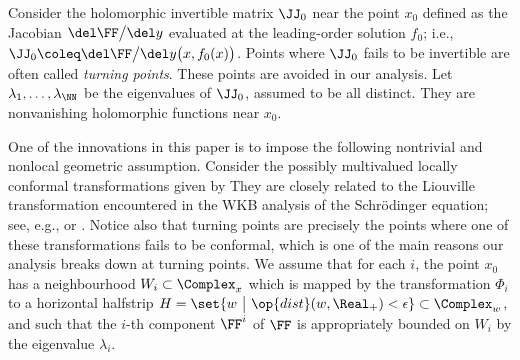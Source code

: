 \documentclass[11pt]{article}
\begin{document}
Consider the holomorphic invertible matrix $\JJ_0$ near the point $x_0$ defined as the Jacobian $\del \FF \big/ \del y$ evaluated at the leading-order solution $f_0$; i.e., $\JJ_0 \coleq \del \FF \big/ \del y\big(x, f_0 (x)\big)$.
Points where $\JJ_0$ fails to be invertible are often called \textit{turning points}.
These points are avoided in our analysis.
Let $\lambda_1, \ldots, \lambda_\NN$ be the eigenvalues of $\JJ_0$, assumed to be all distinct.
They are nonvanishing holomorphic functions near $x_0$.

One of the innovations in this paper is to impose the following nontrivial and nonlocal geometric assumption.
Consider the possibly multivalued locally conformal transformations given by
\vspace{-10pt}
They are closely related to the Liouville transformation encountered in the WKB analysis of the Schrödinger equation; see, e.g., \cite[§4.1]{MY210623112236} or \cite[§6.1]{MR1429619}.
Notice also that turning points are precisely the points where one of these transformations fails to be conformal, which is one of the main reasons our analysis breaks down at turning points.
We assume that for each $i$, the point $x_0$ has a neighbourhood $W_i \subset \Complex_x$ which is mapped by the transformation $\Phi_i$ to a horizontal halfstrip $H = \set{w ~\big|~ \op{dist} (w, \Real_+) < \epsilon} \subset \Complex_w$, and such that the $i$-th component $\FF^i$ of $\FF$ is appropriately bounded on $W_i$ by the eigenvalue $\lambda_i$.

\enlargethispage{15pt}
\end{document}
